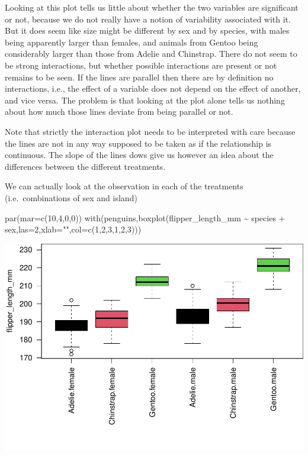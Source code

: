 \documentclass[
]{book}
\newenvironment{Shaded}{\begin{snugshade}}{\end{snugshade}}
\newcommand{\AttributeTok}[1]{\textcolor[rgb]{0.77,0.63,0.00}{#1}}
\newcommand{\DecValTok}[1]{\textcolor[rgb]{0.00,0.00,0.81}{#1}}
\newcommand{\FunctionTok}[1]{\textcolor[rgb]{0.00,0.00,0.00}{#1}}
\newcommand{\NormalTok}[1]{#1}
\newcommand{\SpecialCharTok}[1]{\textcolor[rgb]{0.00,0.00,0.00}{#1}}
\newcommand{\StringTok}[1]{\textcolor[rgb]{0.31,0.60,0.02}{#1}}
\begin{document}
Looking at this plot tells us little about whether the two variables are significant or not, because we do not really have a notion of variability associated with it. But it does seem like size might be different by sex and by species, with males being apparently larger than females, and animals from Gentoo being considerably larger than those from Adelie and Chinstrap. There do not seem to be strong interactions, but whether possible interactions are present or not remains to be seen. If the lines are parallel then there are by definition no interactions, i.e., the effect of a variable does not depend on the effect of another, and vice versa. The problem is that looking at the plot alone tells us nothing about how much those lines deviate from being parallel or not.

Note that strictly the interaction plot needs to be interpreted with care because the lines are not in any way supposed to be taken as if the relationship is continuous. The slope of the lines dows give us however an idea about the differences between the different treatments.

We can actually look at the observation in each of the treatments (i.e.~combinations of sex and island)

\begin{Shaded}
\begin{Highlighting}[]
\FunctionTok{par}\NormalTok{(}\AttributeTok{mar=}\FunctionTok{c}\NormalTok{(}\DecValTok{10}\NormalTok{,}\DecValTok{4}\NormalTok{,}\DecValTok{0}\NormalTok{,}\DecValTok{0}\NormalTok{))}
\FunctionTok{with}\NormalTok{(penguins,}\FunctionTok{boxplot}\NormalTok{(flipper\_length\_mm }\SpecialCharTok{\textasciitilde{}}\NormalTok{ species }\SpecialCharTok{+}\NormalTok{ sex,}\AttributeTok{las=}\DecValTok{2}\NormalTok{,}\AttributeTok{xlab=}\StringTok{""}\NormalTok{,}\AttributeTok{col=}\FunctionTok{c}\NormalTok{(}\DecValTok{1}\NormalTok{,}\DecValTok{2}\NormalTok{,}\DecValTok{3}\NormalTok{,}\DecValTok{1}\NormalTok{,}\DecValTok{2}\NormalTok{,}\DecValTok{3}\NormalTok{)))}
\end{Highlighting}
\end{Shaded}

\includegraphics{ECOMODbook_files/figure-latex/a8.40-1.pdf}
\end{document}
